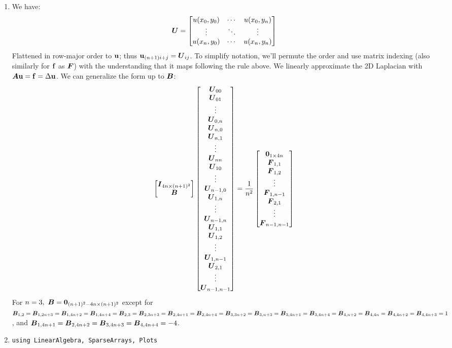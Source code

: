 \documentclass[]{exam}
\begin{document}
\begin{questions}
\begin{enumerate}[label=\arabic*.]
	\item We have:
		$$
		\boldsymbol{U} = \begin{bmatrix} u(x_0, y_0) & \cdots & u(x_0, y_n) \\ \vdots & \ddots & \vdots \\ u(x_n, y_0) & \cdots & u(x_n, y_n) \end{bmatrix}
		$$
		Flattened in row-major order to $\boldsymbol{\mathrm{u}}$; thus $\boldsymbol{\mathrm{u}}_{(n + 1)i + j} = \boldsymbol{U}_{ij}$. To simplify notation, we'll permute the order and use matrix indexing (also similarly for $\boldsymbol{\mathrm{f}}$ as $\boldsymbol{F}$) with the understanding that it maps following the rule above. We linearly approximate the 2D Laplacian with $\boldsymbol{A} \boldsymbol{\mathrm{u}} = \boldsymbol{\mathrm{f}} = \Delta \boldsymbol{\mathrm{u}}$. We can generalize the form up to $\boldsymbol{B}$:
		$$
		\begin{bmatrix}
			\boldsymbol{I}_{4n \times (n + 1)^2} \\
			\boldsymbol{B}
		\end{bmatrix} \begin{bmatrix} \boldsymbol{U}_{00} \\ \boldsymbol{U}_{01} \\ \vdots \\ \boldsymbol{U}_{0,n} \\ \boldsymbol{U}_{n, 0} \\ \boldsymbol{U}_{n, 1} \\ \vdots \\ \boldsymbol{U}_{nn} \\ 
		\boldsymbol{U}_{10} \\ \vdots \\ \boldsymbol{U}_{n - 1, 0} \\
		\boldsymbol{U}_{1, n} \\ \vdots \\ \boldsymbol{U}_{n - 1, n} \\
		\boldsymbol{U}_{1,1} \\ \boldsymbol{U}_{1,2} \\ \vdots \\ \boldsymbol{U}_{1, n-1} \\ \boldsymbol{U}_{2, 1} \\ \vdots \\ \boldsymbol{U}_{n-1, n-1} \end{bmatrix}
		= \frac{1}{n^2} \begin{bmatrix} \mathbf{0}_{1 \times 4n} \\ \boldsymbol{F}_{1,1} \\ \boldsymbol{F}_{1,2} \\ \vdots \\ \boldsymbol{F}_{1, n-1} \\ \boldsymbol{F}_{2, 1} \\ \vdots \\ \boldsymbol{F}_{n-1, n-1} \end{bmatrix}
		$$
		For $n=3,~\boldsymbol{B} = \mathbf{0}_{(n+1)^2 - 4n \times (n + 1)^2}$ except for 
		$\boldsymbol{B}_{1,2} = \boldsymbol{B}_{1, 2n+3} = \boldsymbol{B}_{1, 4n + 2} = \boldsymbol{B}_{1, 4n + 4} = 
		\boldsymbol{B}_{2,3} = \boldsymbol{B}_{2, 3n + 3} = \boldsymbol{B}_{2, 4n + 1} = \boldsymbol{B}_{2, 4n + 4} =
		\boldsymbol{B}_{3,3n + 2} = \boldsymbol{B}_{3, n + 3} = \boldsymbol{B}_{3, 4n + 1} = \boldsymbol{B}_{3, 4n + 4} =
		\boldsymbol{B}_{4,n + 2} = \boldsymbol{B}_{4, 4n} = \boldsymbol{B}_{4, 4n + 2} = \boldsymbol{B}_{4, 4n + 3} = 1$, and 
		$\boldsymbol{B}_{1, 4n + 1} = \boldsymbol{B}_{2, 4n + 2} = \boldsymbol{B}_{3, 4n + 3} = \boldsymbol{B}_{4, 4n + 4} = -4$.
	\item
		\begin{lstlisting}
using LinearAlgebra, SparseArrays, Plots


\end{lstlisting}
\end{enumerate}
\end{questions}
\end{document}
